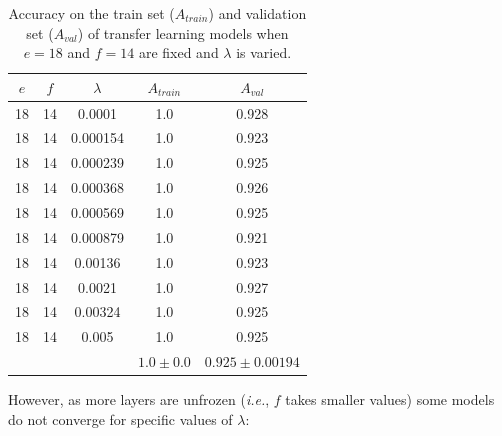 \begin{table}[ht]
\centering
\begin{tabular}{ |c|c|c|c|c| }
\hline
$e$ & $f$ & $\lambda$ & $A_{train}$ & $A_{val}$ \\
\hline
18 & 14 & 0.0001 & 1.0 & 0.928 \\
18 & 14 & 0.000154 & 1.0 & 0.923 \\
18 & 14 & 0.000239 & 1.0 & 0.925 \\
18 & 14 & 0.000368 & 1.0 & 0.926 \\
18 & 14 & 0.000569 & 1.0 & 0.925 \\
18 & 14 & 0.000879 & 1.0 & 0.921 \\
18 & 14 & 0.00136 & 1.0 & 0.923 \\
18 & 14 & 0.0021 & 1.0 & 0.927 \\
18 & 14 & 0.00324 & 1.0 & 0.925 \\
18 & 14 & 0.005 & 1.0 & 0.925 \\
\hline
 & & & $1.0\pm0.0$ & $0.925\pm0.00194$ \\
\hline
\end{tabular}
\caption{Accuracy on the train set ($A_{train}$) and validation set ($A_{val}$) of transfer learning models when $e = 18$ and $f = 14$ are fixed and $\lambda$ is varied.}
\label{table:vgg16_finetuning_14}
\end{table}

However, as more layers are unfrozen (\textit{i.e.}, $f$ takes smaller values) some models do not converge for specific values of $\lambda$:

